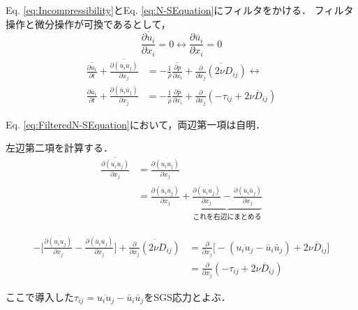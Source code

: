 \documentclass[12pt,a4paper]{jsarticle}
\begin{document}

Eq. \ref{eq:Incompressibility}とEq. \ref{eq:N-SEquation}にフィルタをかける．
フィルタ操作と微分操作が可換であるとして，
\begin{equation}
  \overline{\frac{\partial u_i}{\partial x_i}} = 0 \leftrightarrow \frac{\partial \bar{u}_i}{\partial x_i} = 0 \tag{7.13}
  \label{eq:FilteredIncompressibility}
\end{equation}
\begin{align}
  \overline{\frac{\partial u_i}{\partial t}} +\overline{\frac{\partial (u_i u_j)}{\partial x_j}} &= -\frac{1}{\rho} \overline{\frac{\partial p}{\partial x_i}} +\overline{\frac{\partial}{\partial x_j} (2 \nu D_{ij})} \leftrightarrow \nonumber \\
  \frac{\partial \bar{u}_i}{\partial t} +\frac{\partial (\bar{u}_i \bar{u}_j)}{\partial x_j} &= -\frac{1}{\rho} \frac{\partial \bar{p}}{\partial x_i} +\frac{\partial}{\partial x_j} (-\tau_{ij} +2 \nu \overline{D}_{ij}) \tag{7.16}
\label{eq:FilteredN-SEquation}
\end{align}

Eq. \ref{eq:FilteredN-SEquation}において，両辺第一項は自明．

左辺第二項を計算する．
\begin{align}
  \overline{\frac{\partial (u_i u_j)}{\partial x_j}} &= \frac{\partial \overline{(u_i u_j)}}{\partial x_j} \nonumber \\
    &= \frac{\partial (\bar{u}_i \bar{u}_j)}{\partial x_j} +\underbrace{ \frac{\partial \overline{(u_i u_j)}}{\partial x_j} -\frac{\partial (\bar{u}_i \bar{u}_j)}{\partial x_j} }_{これを右辺にまとめる}
\label{eq:FilteredAdvectionTerm}
\end{align}

\begin{align}
  -\Big[ \frac{\partial \overline{(u_i u_j)}}{\partial x_j} -\frac{\partial (\bar{u}_i \bar{u}_j)}{\partial x_j} \Big] +\overline{\frac{\partial}{\partial x_j} (2 \nu D_{ij})} &= \frac{\partial}{\partial x_j} \Big[ -(\overline{u_i u_j} -\bar{u}_i \bar{u}_j) +2 \nu \overline{D}_{ij} \Big] \nonumber \\
    &= \frac{\partial}{\partial x_j} (-\tau_{ij} +2 \nu \overline{D}_{ij})
\label{eq:FilteredDiffusionTerm}
\end{align}

ここで導入した$\tau_{ij}=\overline{u_i u_j} -\bar{u}_i \bar{u}_j$をSGS応力とよぶ．\\

\end{document}
